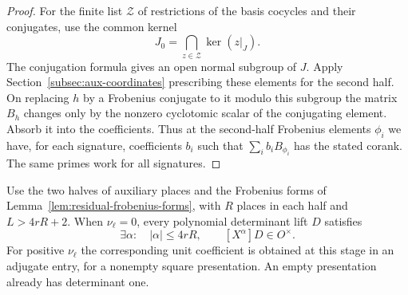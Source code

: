 \begin{proof}
For the finite list \(\mathcal Z\) of restrictions of the basis cocycles and their conjugates, use the common kernel
\[
 J_0=\bigcap_{z\in\mathcal Z}\ker(z|_J).
\]
The conjugation formula gives an open normal subgroup of \(J\).
Apply Section~\ref{subsec:aux-coordinates} prescribing these
elements for the second half. On replacing \(h\) by a
Frobenius conjugate to it modulo this subgroup the matrix
\(B_h\) changes only by the nonzero cyclotomic scalar of the
conjugating element. Absorb it into the coefficients. Thus at
the second-half Frobenius elements \(\phi_i\) we have, for each signature,
coefficients \(b_i\) such that \(\sum_i b_i B_{\phi_i}\) has
the stated corank. The same primes work for all signatures.

\end{proof}
\begin{lemma}\label{lem:residual-selmer-coefficient}
Use the two halves of auxiliary places and the Frobenius forms
of Lemma~\ref{lem:residual-frobenius-forms}, with \(R\) places
in each half and \(L>4rR+2\). When \(\nu_\ell=0\), every polynomial determinant lift \(D\) satisfies
\[
 \exists\alpha:\quad |\alpha|\le4rR,\qquad [X^\alpha]D\in O^\times.
\] For positive \(\nu_\ell\) the corresponding
unit coefficient is obtained at this stage in an adjugate
entry, for a nonempty square presentation. An empty presentation
already has determinant one.
\end{lemma}

